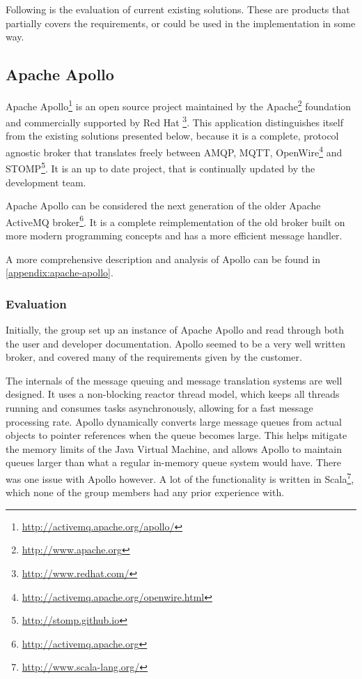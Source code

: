 Following is the evaluation of current existing solutions. These are products that partially covers the requirements, or could be used in the implementation in some way.

\subsection{Apache Apollo}
\label{subsec:prestudies-existing_solutions-apache_apollo}

Apache Apollo\footnote{\url{http://activemq.apache.org/apollo/}} is an open source project maintained by the Apache\footnote{\url{http://www.apache.org}} foundation and commercially supported by Red Hat \footnote{\url{http://www.redhat.com/}}. This application distinguishes itself from the existing solutions presented below, because it is a complete, protocol agnostic broker that translates freely between AMQP, MQTT, OpenWire\footnote{\url{http://activemq.apache.org/openwire.html}} and STOMP\footnote{\url{http://stomp.github.io}}. It is an up to date project, that is continually updated by the development team.

Apache Apollo can be considered the next generation of the older Apache ActiveMQ broker\footnote{\url{http://activemq.apache.org}}. It is a complete reimplementation of the old broker built on more modern programming concepts and has a more efficient message handler.

A more comprehensive description and analysis of Apollo can be found in \ref{appendix:apache-apollo}.

\subsubsection{Evaluation}
\label{subsec:prestudies-existing_solutions-apache_apollo-evaluation}

Initially, the group set up an instance of Apache Apollo and read through both the user and developer documentation. Apollo seemed to be a very well written broker, and covered many of the requirements given by the customer.

The internals of the message queuing and message translation systems are well designed. It uses a non-blocking reactor thread model, which keeps all threads running and consumes tasks asynchronously, allowing for a fast message processing rate. Apollo dynamically converts large message queues from actual objects to pointer references when the queue becomes large. This helps mitigate the memory limits of the Java Virtual Machine, and allows Apollo to maintain queues larger than what a regular in-memory queue system would have. There was one issue with Apollo however. A lot of the functionality is written in Scala\footnote{\url{http://www.scala-lang.org/}}, which none of the group members had any prior experience with.

